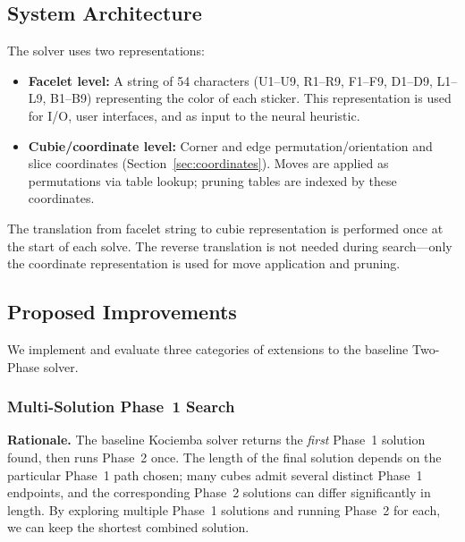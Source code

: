 \documentclass[10pt,twocolumn,a4paper]{article}
\begin{document}
\subsection{System Architecture}
The solver uses two representations:
\begin{itemize}[leftmargin=*]
  \item \textbf{Facelet level:} A string of 54 characters (U1--U9, R1--R9, F1--F9, D1--D9, L1--L9, B1--B9) representing the color of each sticker. This representation is used for I/O, user interfaces, and as input to the neural heuristic.
  \item \textbf{Cubie/coordinate level:} Corner and edge permutation/orientation and slice coordinates (Section~\ref{sec:coordinates}). Moves are applied as permutations via table lookup; pruning tables are indexed by these coordinates.
\end{itemize}

The translation from facelet string to cubie representation is performed once at the start of each solve. The reverse translation is not needed during search---only the coordinate representation is used for move application and pruning.

\subsection{Proposed Improvements}
\label{sec:improvements}

We implement and evaluate three categories of extensions to the baseline Two-Phase solver.

\subsubsection{Multi-Solution Phase~1 Search}
\label{sec:multi-phase1}

\textbf{Rationale.} The baseline Kociemba solver returns the \emph{first} Phase~1 solution found, then runs Phase~2 once. The length of the final solution depends on the particular Phase~1 path chosen; many cubes admit several distinct Phase~1 endpoints, and the corresponding Phase~2 solutions can differ significantly in length. By exploring multiple Phase~1 solutions and running Phase~2 for each, we can keep the shortest combined solution.
\end{document}
